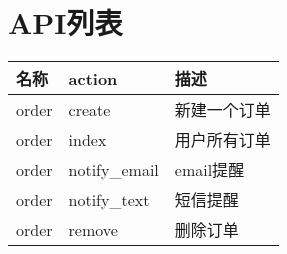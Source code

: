 \section{API列表}

\begin{center}
    \label{table:api_list}
    \begin{longtable}{lll}
        \toprule
        名称 & action & 描述\\
        \midrule
        order & create & 新建一个订单\\
        order & index & 用户所有订单\\
        order & notify\_email & email提醒 \\
        order & notify\_text & 短信提醒 \\
        order & remove & 删除订单 \\
        \bottomrule
    \end{longtable}
\end{center}
